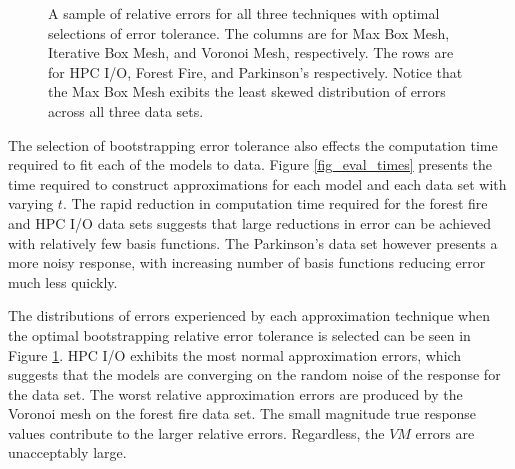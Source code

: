 \begin{figure}[htb]
  \caption{A sample of relative errors for all three techniques with optimal selections of error tolerance. The columns are for Max Box Mesh, Iterative Box Mesh, and Voronoi Mesh, respectively. The rows are for HPC I/O, Forest Fire, and Parkinson's respectively. Notice that the Max Box Mesh exibits the least skewed distribution of errors across all three data sets.
    \vspace{-.3cm}}
  \label{fig_perf_sample}
\end{figure}

The selection of bootstrapping error tolerance also effects the computation time required to fit each of the models to data. Figure \ref{fig_eval_times} presents the time required to construct approximations for each model and each data set with varying $t$. The rapid reduction in computation time required for the forest fire and HPC I/O data sets suggests that large reductions in error can be achieved with relatively few basis functions. The Parkinson's data set however presents a more noisy response, with increasing number of basis functions reducing error much less quickly.

The distributions of errors experienced by each approximation technique when the optimal bootstrapping relative error tolerance is selected can be seen in Figure \ref{fig_perf_sample}. HPC I/O exhibits the most normal approximation errors, which suggests that the models are converging on the random noise of the response for the data set. The worst relative approximation errors are produced by the Voronoi mesh on the forest fire data set. The small magnitude true response values contribute to the larger relative errors. Regardless, the $VM$ errors are unacceptably large.

